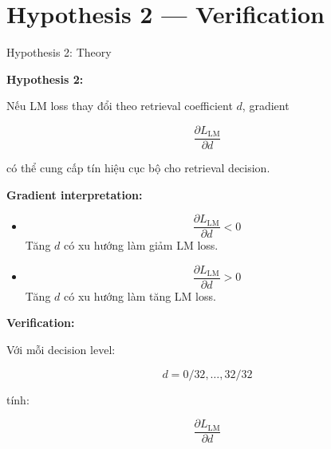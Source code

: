 
\section{Hypothesis 2 — Verification}

\begin{frame}{Hypothesis 2: Theory}

\textbf{Hypothesis 2:}

Nếu LM loss thay đổi theo retrieval coefficient $d$, gradient

\[
\frac{\partial L_{\mathrm{LM}}}{\partial d}
\]

có thể cung cấp tín hiệu cục bộ cho retrieval decision.

\vspace{0.25cm}

\textbf{Gradient interpretation:}

\begin{itemize}
    \item
    \[
    \frac{\partial L_{\mathrm{LM}}}{\partial d}<0
    \]
    Tăng $d$ có xu hướng làm giảm LM loss.

    \item
    \[
    \frac{\partial L_{\mathrm{LM}}}{\partial d}>0
    \]
    Tăng $d$ có xu hướng làm tăng LM loss.
\end{itemize}

\vspace{0.2cm}

\textbf{Verification:}

Với mỗi decision level:

\[
d=0/32,\ldots,32/32
\]

tính:

\[
\frac{\partial L_{\mathrm{LM}}}{\partial d}
\]

\end{frame}




